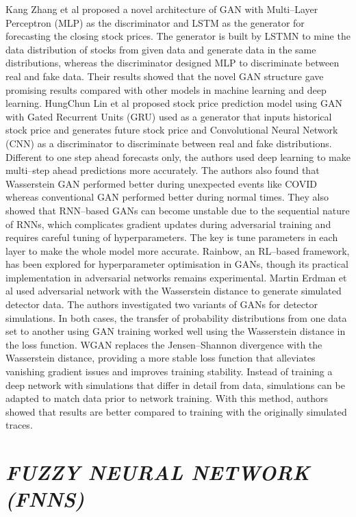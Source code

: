 \documentclass[12pt,a4paper]{report}
\numberwithin{equation}{section}
\begin{document}
Kang Zhang et al \cite{zhanga2018stock_63} proposed a novel architecture of GAN with
Multi--Layer Perceptron (MLP) as the discriminator and LSTM as the
generator for forecasting the closing stock prices. The generator is
built by LSTMN to mine the data distribution of stocks from given data
and generate data in the same distributions, whereas the discriminator
designed MLP to discriminate between real and fake data. Their results
showed that the novel GAN structure gave promising results compared with
other models in machine learning and deep learning. HungChun Lin et al
\cite{lin2021stock_64} proposed stock price prediction model using GAN with Gated
Recurrent Units (GRU) used as a generator that inputs historical stock
price and generates future stock price and Convolutional Neural Network
(CNN) as a discriminator to discriminate between real and fake
distributions. Different to one step ahead forecasts only, the authors
used deep learning to make multi--step ahead predictions more accurately.
The authors also found that Wasserstein GAN performed better during
unexpected events like COVID whereas conventional GAN performed better
during normal times. They also showed that RNN--based GANs can become
unstable due to the sequential nature of RNNs, which complicates
gradient updates during adversarial training and requires careful tuning
of hyperparameters. The key is tune parameters in each layer to make the
whole model more accurate. Rainbow, an RL--based framework, has been
explored for hyperparameter optimisation in GANs, though its practical
implementation in adversarial networks remains experimental. Martin
Erdman et al \cite{erdmann2018generating_65} used adversarial network with the Wasserstein
distance to generate simulated detector data. The authors investigated
two variants of GANs for detector simulations. In both cases, the
transfer of probability distributions from one data set to another using
GAN training worked well using the Wasserstein distance in the loss
function. WGAN replaces the Jensen--Shannon divergence with the
Wasserstein distance, providing a more stable loss function that
alleviates vanishing gradient issues and improves training stability.
Instead of training a deep network with simulations that differ in
detail from data, simulations can be adapted to match data prior to
network training. With this method, authors showed that results are
better compared to training with the originally simulated traces.

\hypertarget{fuzzy--neural--network--fnns}{%
\section{\texorpdfstring{\emph{\textbf{FUZZY NEURAL NETWORK
(FNNS)}}
}{FUZZY NEURAL NETWORK (FNNS) }}\label{fuzzy--neural--network--fnns}}
\end{document}
